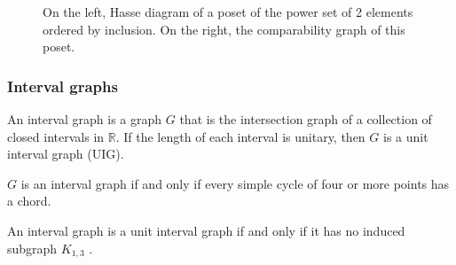 \begin{figure}
\centering

\begin{scaletikzpicturetowidth}{\textwidth}
\end{scaletikzpicturetowidth}

\caption{On the left, Hasse diagram of a poset of the power set of 2 elements ordered by inclusion.
On the right, the comparability graph of this poset.}
\label{fig:hasse}
\end{figure}

\subsubsection{Interval graphs}

An interval graph is a graph $G$ that is the intersection graph of a collection
of closed intervals in $\mathbb{R}$. If the length of each interval is unitary,
then $G$ is a unit interval graph (UIG).

\begin{theorem}
  $G$ is an interval graph if and only if every simple cycle of four or more
  points has a chord. \cite{FISHBURN1985135}
\end{theorem}

\begin{theorem}
  An interval graph is a unit interval graph if and only if it has no induced subgraph $K_{1,3}$ \cite{roberts1968representations}.
\end{theorem}

